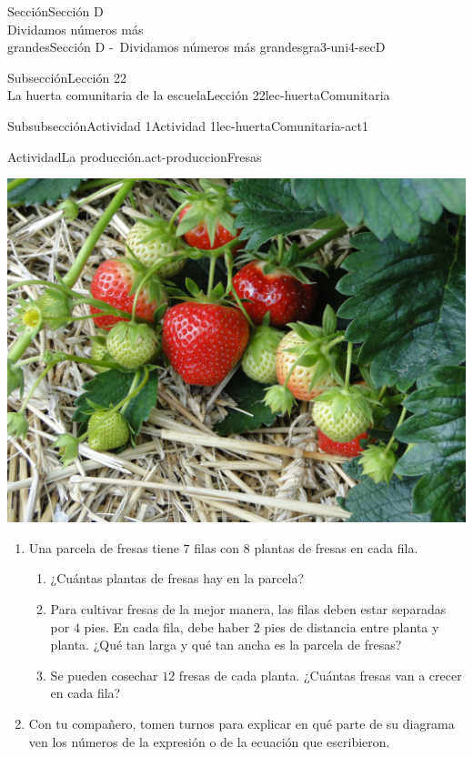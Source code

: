 \begin{sectionptx}{Sección}{{\Large Sección D\\}Dividamos números más\\grandes}{}{Sección D -~Dividamos números más grandes}{}{}{gra3-uni4-secD}
\begin{subsectionptx}{Subsección}{{\normalsize Lección 22\\[-0.05cm]}La huerta comunitaria de la escuela}{}{Lección 22}{}{}{lec-huertaComunitaria}
\begin{subsubsectionptx}{Subsubsección}{Actividad 1}{}{Actividad 1}{}{}{lec-huertaComunitaria-act1}
\begin{activity}{Actividad}{La producción.}{act-produccionFresas}
\begin{sidebyside}{2}{0.025}{0.025}{0.05}
\begin{sbspanel}{0.3}
\includegraphics[max width=\linewidth, center]{external/jpg-source/3-4-D-22 Act1-Fresas.jpg}
\end{sbspanel}%
\end{sidebyside}%
%
\begin{enumerate}
\item{}Una parcela de fresas tiene \(7\) filas con \(8\) plantas de fresas en cada fila.%
%
\begin{enumerate}
\item{}¿Cuántas plantas de fresas hay en la parcela?%
\item{}Para cultivar fresas de la mejor manera, las filas deben estar separadas por \(4\) pies. En cada fila, debe haber \(2\) pies de distancia entre planta y planta. ¿Qué tan larga y qué tan ancha es la parcela de fresas?%
\item{}Se pueden cosechar \(12\) fresas de cada planta. ¿Cuántas fresas van a crecer en cada fila?%
\end{enumerate}
\item{}Con tu compañero, tomen turnos para explicar en qué parte de su diagrama ven los números de la expresión o de la ecuación que escribieron.%
\end{enumerate}
\end{activity}%
%
\end{subsubsectionptx}
%
%
\typeout{************************************************}
\typeout{************************************************}
%

\end{subsectionptx}
\end{sectionptx}
